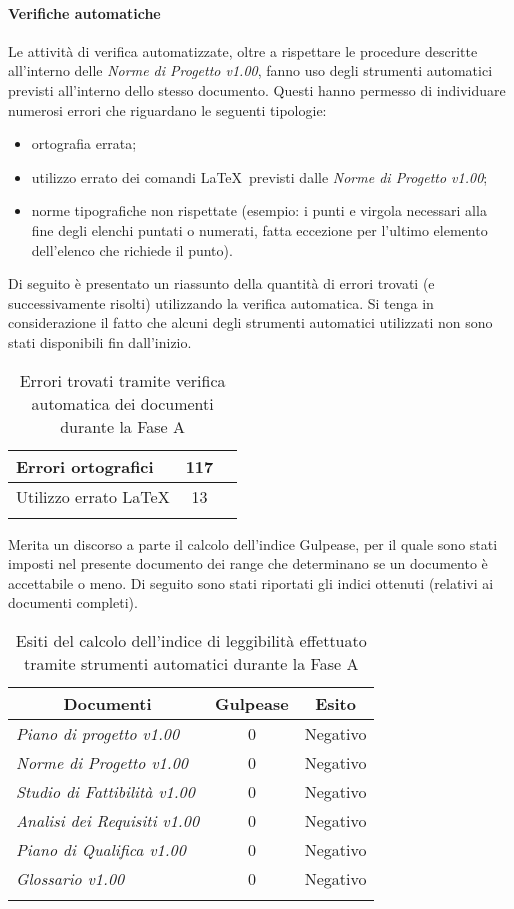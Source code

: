 \documentclass[../PianoDiQualifica.tex]{subfiles}
\begin{document}
\begin{appendices}
			\paragraph{Verifiche automatiche}
			Le attività di verifica automatizzate, oltre a rispettare le procedure descritte all'interno delle \textit{Norme di Progetto v1.00}, fanno uso degli strumenti automatici previsti all'interno dello stesso documento. Questi hanno permesso di individuare numerosi errori che riguardano le seguenti tipologie:
			\begin{itemize}
				\item ortografia errata;
				\item utilizzo errato dei comandi \LaTeX\ previsti dalle \textit{Norme di Progetto v1.00};
				\item norme tipografiche non rispettate (esempio: i punti e virgola necessari alla fine degli elenchi puntati o numerati, fatta eccezione per l'ultimo elemento dell'elenco che richiede il punto).
			\end{itemize}
			Di seguito è presentato un riassunto della quantità di errori trovati (e successivamente risolti) utilizzando la verifica automatica. Si tenga in considerazione il fatto che alcuni degli strumenti automatici utilizzati non sono stati disponibili fin dall'inizio.
\begin{longtable}{|l|c|c|}
 \hline Errori ortografici      &  117\\
 \hline Utilizzo errato \LaTeX     &  13\\
\hline
\caption{Errori trovati tramite verifica automatica dei documenti durante la Fase A}
\end{longtable}	
			Merita un discorso a parte il calcolo dell'indice Gulpease, per il quale sono stati imposti nel presente documento dei range che determinano se un documento è accettabile o meno. Di seguito sono stati riportati gli indici ottenuti (relativi ai documenti completi).
\begin{longtable}{|l|c|c|}
\hline
 \multicolumn{1}{|c|}{\textbf{Documenti}}
 & \multicolumn{1}{|c|}{\textbf{Gulpease}}
 & \multicolumn{1}{|c|}{\textbf{Esito}}
\\ \hline
 \hline \textit{Piano di progetto v1.00}      &  0  & Negativo\\
 \hline \textit{Norme di Progetto v1.00}     &  0  & Negativo\\
 \hline \textit{Studio di Fattibilità v1.00}       &  0  & Negativo\\
 \hline \textit{Analisi dei Requisiti v1.00}      &  0   & Negativo\\
 \hline \textit{Piano di Qualifica v1.00}        &  0   & Negativo\\
 \hline \textit{Glossario v1.00}     &  0   & Negativo\\
\hline
\caption{Esiti del calcolo dell'indice di leggibilità effettuato tramite strumenti automatici durante la Fase A}
\end{longtable}

\end{appendices}
\end{document}
